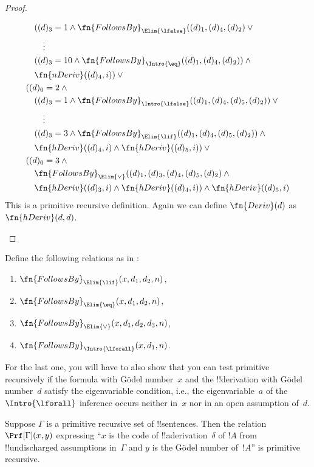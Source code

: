\documentclass[../../../include/open-logic-section]{subfiles}
\begin{document}
\begin{proof}
\begin{enumerate}
\begin{multline*}
\begin{aligned}
& \quad ((d)_3 = 1 \land
\fn{FollowsBy}_{\Elim{\lfalse}}((d)_1, (d)_4, (d)_2) \lor{}\\
& \qquad \vdots\\
& \quad ((d)_3 = 10 \land
\fn{FollowsBy}_{\Intro{\eq}}((d)_1, (d)_4, (d)_2)) \land {}\\
& \quad \fn{nDeriv}((d)_4, i)) \lor {}\\
& ((d)_0 = 2 \land {}\\
& \quad ((d)_3 = 1 \land 
\fn{FollowsBy}_{\Intro{\lfalse}}((d)_1, (d)_4, (d)_5, (d)_2)) \lor{}\\
& \qquad \vdots\\
& \quad ((d)_3 = 3 \land
\fn{FollowsBy}_{\Elim{\lif}}((d)_1, (d)_4, (d)_5, (d)_2)) \land {}\\
& \quad \fn{hDeriv}((d)_4, i) \land \fn{hDeriv}((d)_5, i)) \lor {}\\
& ((d)_0 = 3 \land {}\\
& \quad \fn{FollowsBy}_{\Elim{\lor}}((d)_1, (d)_3, (d)_4, (d)_5, (d)_2) \land{}\\
& \quad \fn{hDeriv}((d)_3, i) \land \fn{hDeriv}((d)_4, i)) \land \fn{hDeriv}((d)_5, i)  
  \end{aligned}
  \end{multline*}
This is a primitive recursive definition. Again we can define
$\fn{Deriv}(d)$ as $\fn{hDeriv}(d, d)$.
\end{enumerate}
\end{proof}

\begin{prob}
Define the following relations as in
:
\begin{enumerate}
\item $\fn{FollowsBy}_{\Elim{\lif}}(x, d_1, d_2, n)$,
\item $\fn{FollowsBy}_{\Elim{\eq}}(x, d_1, d_2, n)$,
\item $\fn{FollowsBy}_{\Elim{\lor}}(x, d_1, d_2, d_3, n)$,
\item $\fn{FollowsBy}_{\Intro{\lforall}}(x, d_1, n)$.
\end{enumerate}
For the last one, you will have to also show that you can test
primitive recursively if the formula with G\"odel number~$x$ and the
!!{derivation} with G\"odel number~$d$ satisfy the eigenvariable
condition, i.e., the eigenvariable~$a$ of the $\Intro{\lforall}$
inference occurs neither in~$x$ nor in an open assumption of~$d$.
\end{prob}

\begin{prop}
Suppose $\Gamma$ is a primitive recursive set of !!{sentence}s.  Then
the relation $\Prf[\Gamma](x, y)$ expressing ``$x$ is the code of
!!a{derivation}~$\delta$ of $!A$ from !!{undischarged} assumptions
in~$\Gamma$ and $y$ is the G\"odel number of~$!A$'' is primitive
recursive.
\end{prop}
\end{document}
